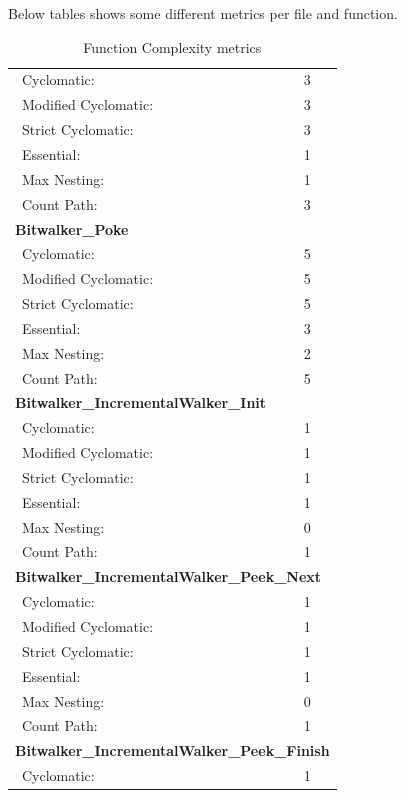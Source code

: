 Below tables shows some different metrics per file and function.

\begin{longtable}{||p{}|p{}||}
  \caption{Function Complexity metrics}\\
    \hline\hline
    \endhead
    \hline\hline
    \endfoot
\multicolumn{2}{||l||}{\textbf{Bitwalker\_Peek}}
\\\hline
\ Cyclomatic: & 3
\\\hline
\ Modified Cyclomatic: & 3
\\\hline
\ Strict Cyclomatic: & 3
\\\hline
\ Essential: & 1
 \\\hline
\ Max Nesting:   & 1
 \\\hline
\ Count Path: & 3
\\\hline
\multicolumn{2}{||l||}{\textbf{Bitwalker\_Poke}}
\\\hline
\ Cyclomatic: & 5
\\\hline
\ Modified Cyclomatic: & 5
\\\hline
\ Strict Cyclomatic: & 5
\\\hline
\ Essential: & 3
 \\\hline
\ Max Nesting:   & 2
 \\\hline
\ Count Path: & 5
\\\hline
\multicolumn{2}{||l||}{\textbf{Bitwalker\_IncrementalWalker\_Init}}
\\\hline
\ Cyclomatic: & 1
\\\hline
\ Modified Cyclomatic: & 1
\\\hline
\ Strict Cyclomatic: & 1 
\\\hline
\ Essential: & 1
 \\\hline
\ Max Nesting:   & 0
 \\\hline
\ Count Path: & 1
\\\hline
\multicolumn{2}{||l||}{\textbf{Bitwalker\_IncrementalWalker\_Peek\_Next}}
\\\hline
\ Cyclomatic: & 1
\\\hline
\ Modified Cyclomatic: & 1
\\\hline
\ Strict Cyclomatic: & 1 
\\\hline
\ Essential: & 1
 \\\hline
\ Max Nesting:   & 0
 \\\hline
\ Count Path: & 1
\\\hline
\multicolumn{2}{||l||}{\textbf{Bitwalker\_IncrementalWalker\_Peek\_Finish}}
\\\hline
\ Cyclomatic: & 1

\end{longtable}
